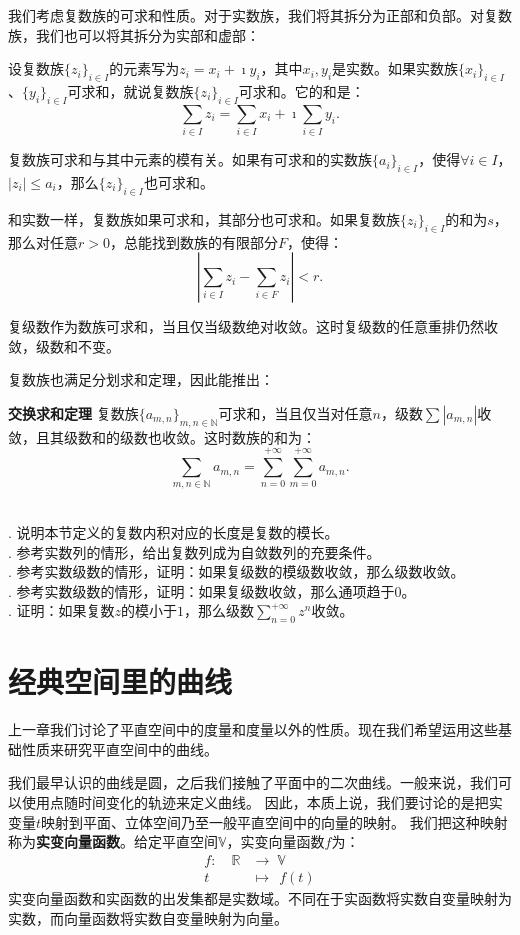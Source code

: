 \documentclass[12pt,UTF8]{ctexbook}
\begin{document}
我们考虑复数族的可求和性质。对于实数族，我们将其拆分为正部和负部。对复数族，我们也可以将其拆分为实部和虚部：
\begin{tm}
    设复数族$\{z_i\}_{i\in I}$的元素写为$z_i = x_i + \imath y_i $，其中$x_i, y_i$是实数。如果实数族$\{x_i\}_{i\in I}$、$\{y_i\}_{i\in I}$可求和，就说复数族$\{z_i\}_{i\in I}$可求和。它的和是：
    $$ \sum_{i\in I} z_i = \sum_{i\in I} x_i + \imath \sum_{i\in I} y_i. $$
\end{tm}
复数族可求和与其中元素的模有关。如果有可求和的实数族$\{a_i\}_{i\in I}$，使得$\forall i\in I$，$|z_i| \leqslant a_i$，那么$\{z_i\}_{i\in I}$也可求和。

和实数一样，复数族如果可求和，其部分也可求和。如果复数族$\{z_i\}_{i\in I}$的和为$s$，那么对任意$r>0$，总能找到数族的有限部分$F$，使得：
$$ \left| \sum_{i\in I} z_i - \sum_{i\in F} z_i \right| < r. $$

复级数作为数族可求和，当且仅当级数绝对收敛。这时复级数的任意重排仍然收敛，级数和不变。

复数族也满足分划求和定理，因此能推出：
\begin{tm}{\textbf{交换求和定理}}
    复数族$\{a_{m,n}\}_{m,n\in\mathbb{N}}$可求和，当且仅当对任意$n$，级数$\sum |a_{m,n}|$收敛，且其级数和的级数也收敛。这时数族的和为：
    $$ \sum_{m,n\in\mathbb{N}} a_{m,n} = \sum_{n=0}^{+\infty} \sum_{m=0}^{+\infty} a_{m,n}. $$
\end{tm}

\begin{xt}
    \mbox{} \\
    . 说明本节定义的复数内积对应的长度是复数的模长。\\
    . 参考实数列的情形，给出复数列成为自敛数列的充要条件。\\ 
    . 参考实数级数的情形，证明：如果复级数的模级数收敛，那么级数收敛。\\
    . 参考实数级数的情形，证明：如果复级数收敛，那么通项趋于$0$。\\
    . 证明：如果复数$z$的模小于$1$，那么级数$\sum_{n=0}^{+\infty} z^n$收敛。
\end{xt}

\chapter{经典空间里的曲线}

上一章我们讨论了平直空间中的度量和度量以外的性质。现在我们希望运用这些基础性质来研究平直空间中的曲线。

我们最早认识的曲线是圆，之后我们接触了平面中的二次曲线。一般来说，我们可以使用点随时间变化的轨迹来定义曲线。
因此，本质上说，我们要讨论的是把实变量$t$映射到平面、立体空间乃至一般平直空间中的向量的映射。
我们把这种映射称为\textbf{实变向量函数}。给定平直空间$\mathbb{V}$，实变向量函数$f$为：
\begin{align*}
    f: \quad \mathbb{R} &\rightarrow \; \mathbb{V} \\
      t \; &\mapsto \;\,f(t)
\end{align*}
实变向量函数和实函数的出发集都是实数域。不同在于实函数将实数自变量映射为实数，而向量函数将实数自变量映射为向量。
\end{document}
